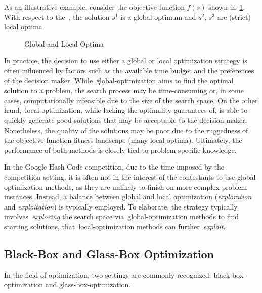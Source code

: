 As an illustrative example, consider the objective function $f(s)$ shown in~\ref{fig:optima}.
With respect to the~, the solution
$s^1$ is a global optimum and $s^2$, $s^3$ are (strict) local optima.

\begin{figure}[h]
  \centering
  
  \caption{Global and Local Optima}
  \label{fig:optima}
\end{figure}

In practice, the decision to use either a global or local optimization strategy
is often influenced by factors such as the available time budget and the
preferences of the decision maker. While~\acrshort{global-optimization} aims to
find the optimal solution to a problem, the search process may be time-consuming
or, in some cases, computationally infeasible due to the size of the search
space.  On the other hand,~\acrshort{local-optimization}, while lacking the
optimality guarantees of, is able to quickly generate good solutions that may be
acceptable to the decision maker. Nonetheless, the quality of the solutions may
be poor due to the ruggedness of the objective function fitness landscape (many
local optima). Ultimately, the performance of both methods is closely tied to
problem-specific knowledge.

In the Google Hash Code competition, due to the time imposed by the competition
setting, it is often not in the interest of the contestants to use global
optimization methods, as they are unlikely to finish on more complex problem
instances. Instead, a balance between global and local optimization
(\textit{exploration} and \textit{exploitation}) is typically employed. To
elaborate, the strategy typically involves~\textit{exploring} the search space
via~\acrshort{global-optimization} methods to find  starting
solutions, that~\acrshort{local-optimization} methods can
further~\textit{exploit}.

\subsection{Black-Box and Glass-Box Optimization}

In the field of optimization, two settings are commonly recognized:
\acrfull{black-box-optimization} and \acrfull{glass-box-optimization}.

